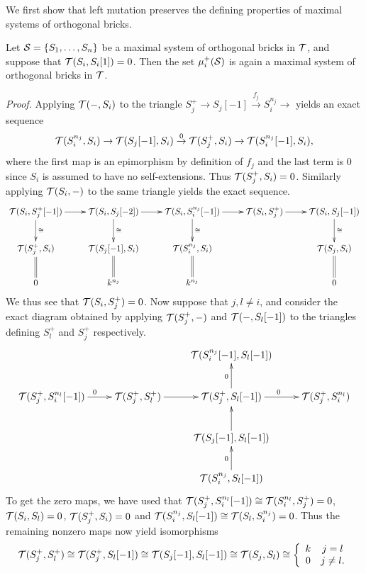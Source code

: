 \documentclass{amsart}
\begin{document}
We first show that left mutation preserves the defining properties of maximal systems of orthogonal bricks.  

\begin{therm} Let $\mathcal{S} = \{S_1, \ldots, S_n\}$ be a maximal system of orthogonal bricks in $\mathcal{T}$, and suppose that $\mathcal{T}(S_i, S_i[1]) = 0$.  Then the set $\mu^+_i(\mathcal{S})$ is again a maximal system of orthogonal bricks in $\mathcal{T}$.
\end{therm}  

\noindent
{\it Proof.}  Applying $\mathcal{T}(-,S_i)$ to the triangle $S^+_j \rightarrow S_j[-1] \stackrel{f_j}{\rightarrow} S_i^{n_j} \rightarrow$ yields an exact sequence $$\mathcal{T}(S_i^{n_j},S_i) \rightarrow \mathcal{T}(S_j[-1],S_i) \stackrel{0}{\rightarrow} \mathcal{T}(S^+_j,S_i) \rightarrow \mathcal{T}(S_i^{n_j}[-1],S_i),$$
where the first map is an epimorphism by definition of $f_j$ and the last term is $0$ since $S_i$ is assumed to have no self-extensions.   Thus $\mathcal{T}(S^+_j,S_i)=0$.  Similarly applying $\mathcal{T}(S_i,-)$ to the same triangle yields the exact sequence.
$$\xymatrix{\T(S_i,S^+_j[-1]) \ar[r] \ar[d]^{\cong} &  \T(S_i, S_j[-2]) \ar[r] \ar[d]^{\cong} & \T(S_i,S_i^{n_j}[-1]) \ar[r] \ar[d]^{\cong} & \T(S_i, S^+_j) \ar[r] & \T(S_i,S_j[-1]) \ar[d]^{\cong} \\ \T(S^+_j,S_i) \ar@{=}[d] & \T(S_j[-1],S_i) \ar@{=}[d] & \T(S_i^{n_j},S_i) \ar@{=}[d] & & \T(S_j,S_i) \ar@{=}[d] \\ 0 & k^{n_j} & k^{n_j} & & 0}$$
We thus see that $\mathcal{T}(S_i, S^+_j) = 0$.
Now suppose that $j, l \neq i$, and consider the exact diagram obtained by applying $\mathcal{T}(S^+_j,-)$ and $\mathcal{T}(-,S_l[-1])$ to the triangles defining $S^+_l$ and $S^+_j$ respectively.
$$\xymatrix{ & & \T(S_i^{n_j}[-1], S_l[-1]) \\ \T(S^+_j, S_i^{n_l}[-1]) \ar[r]^0 &\T(S^+_j, S^+_l) \ar[r] & \T(S^+_j, S_l[-1]) \ar[r]^0 \ar[u]^0 & \T(S^+_j, S_i^{n_l}) \\ & & \T(S_j[-1], S_l[-1]) \ar[u] \\ & & \T(S_i^{n_j}, S_l[-1]) \ar[u]^0 
}$$
To get the zero maps, we have used that $\mathcal{T}(S^+_j, S_i^{n_l}[-1]) \cong \mathcal{T}(S_i^{n_l},S^+_j)=0$, $\mathcal{T}(S_i,S_l)=0$, $\mathcal{T}(S^+_j,S_i)=0$ and $\mathcal{T}(S_i^{n_j},S_l[-1]) \cong \mathcal{T}(S_l,S_i^{n_j}) = 0$.  Thus the remaining nonzero maps now yield isomorphisms $$\mathcal{T}(S^+_j, S^+_l) \cong \mathcal{T}(S^+_j, S_l[-1]) \cong \mathcal{T}(S_j[-1],S_l[-1]) \cong \mathcal{T}(S_j,S_l) \cong \left\{ \begin{array}{cc} k & j = l \\ 0 & j \neq l. \end{array} \right.$$
\end{document}
